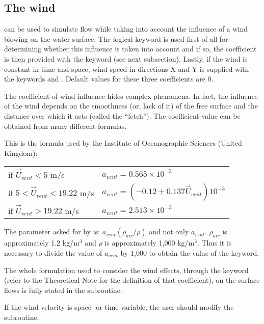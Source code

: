 \subsection{The wind}

 can be used to simulate flow while taking into account the influence
of a wind blowing on the water surface. The logical keyword  is
used first of all for determining whether this influence is taken into account
and if so, the coefficient is then provided with the keyword
(see next subsection). Lastly, if the
wind is constant in time and space, wind speed in directions X and Y is
supplied with the keywords  and . Default values for these three coefficients are 0.

The coefficient of wind influence hides complex phenomena. In fact, the
influence of the wind depends on the smoothness (or, lack of it) of the free
surface and the distance over which it acts (called the ``fetch''). The
coefficient value can be obtained from many different formulas.

This is the formula used by the Institute of Oceanographic Sciences (United
Kingdom):

\begin{tabular}{ll}
if $\overrightarrow{U}_{vent} < 5$ m/s & $a_{vent}  = 0.565 \times 10^{-3}$ \\
if $5 < \overrightarrow{U}_{vent}  < 19.22$ m/s & $a_{vent} = (- 0.12 + 0.137\overrightarrow{U}_{vent} ) 10^{-3}$ \\
if $\overrightarrow{U}_{vent} > 19.22$ m/s & $a_{vent} = 2.513 \times 10^{-3}$ \\
\end{tabular}

The parameter  asked for by 
is: $a_{vent} (\rho_{air} / \rho)$ and not only $a_{vent}$.
$\rho_{air}$ is approximately 1.2 kg/m$^3$ and $\rho$
is approximately 1,000 kg/m$^3$. Thus it is necessary to divide the value of
$a_{vent}$ by 1,000 to obtain the value of the  keyword.

The whole formulation used to consider the wind effects, through the keyword
 (refer to the Theoretical Note for the
definition of that coefficient), on the surface flows is fully stated in the
 subroutine.

If the wind velocity is space- or time-variable, the user should modify the
 subroutine.

